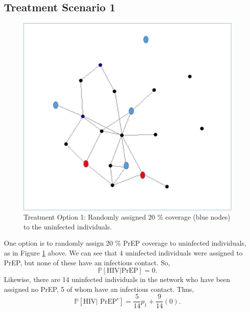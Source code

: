 \documentclass{article}
\theoremstyle{definition}
\begin{document}
\subsection{Treatment Scenario 1} 
\begin{figure}[H]
    \centering
    \includegraphics[scale=0.5]{Network Example 3.png}
    \caption{Treatment Option 1: Randomly assigned 20 \% coverage (blue nodes) to the uninfected individuals.}
    \label{fig:Figure 4}
\end{figure}

One option is to randomly assign 20 \% PrEP coverage to uninfected individuals, as in Figure \ref{fig:Figure 4} above.
We can see that 4 uninfected individuals were assigned to PrEP, but none of these have an infectious contact. So, $$\mathbb{P}\left[\text{HIV}\vert \text{PrEP} \right]=0.$$ Likewise, there are 14 uninfected individuals in the network who have been assigned no PrEP, 5 of whom have an infectious contact. Thus, $$\mathbb{P}\left[\text{HIV} \vert \text{ PrEP}^{c}\right]=\frac{5}{14}p_{1}+\frac{9}{14}\left(0\right).$$  
\end{document}
